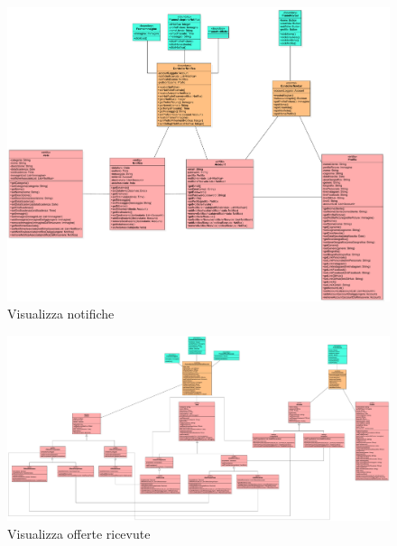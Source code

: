             \begin{figure}[htbp!]
                \centering
                    \includegraphics[width=1\linewidth]{Immagini/Diagrammi/Class Diagram/Utente che ha effettuato l'accesso/VisualizzaNotifiche.pdf}
                \caption{Visualizza notifiche}
            \end{figure}
            
            \begin{figure}[htbp!]
                \centering
                    \includegraphics[width=1\linewidth]{Immagini/Diagrammi/Class Diagram/Utente che ha effettuato l'accesso/VisualizzaOfferteRicevute.pdf}
                \caption{Visualizza offerte ricevute}
            \end{figure}
            
